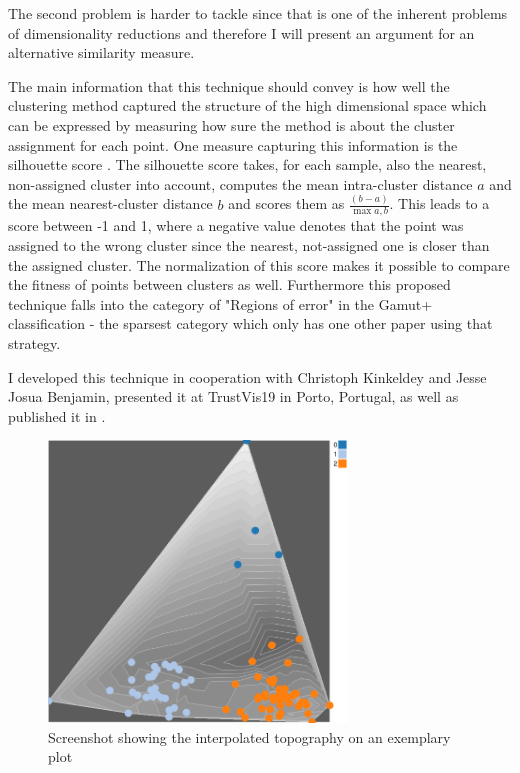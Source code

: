 The second problem is harder to tackle since that is one of the inherent problems of dimensionality reductions and therefore I will present an argument for an alternative similarity measure.

The main information that this technique should convey is how well the clustering method captured the structure of the high dimensional space which can be expressed by measuring how sure the method is about the cluster assignment for each point. One measure capturing this information is the silhouette score \cite{rousseeuwSilhouettesGraphicalAid1987}. The silhouette score takes, for each sample, also the nearest, non-assigned cluster into account, computes the mean intra-cluster distance $a$ and the mean nearest-cluster distance $b$ and scores them as $\frac{(b-a)}{\max{a,b}}$. This leads to a score between -1 and 1, where a negative value denotes that the point was assigned to the wrong cluster since the nearest, not-assigned one is closer than the assigned cluster. The normalization of this score makes it possible to compare the fitness of points between clusters as well. Furthermore this proposed technique falls into the category of "Regions of error" in the Gamut+ classification - the sparsest category which only has one other paper using that strategy. 

I developed this technique in cooperation with Christoph Kinkeldey and Jesse Josua Benjamin, presented it at TrustVis19 in Porto, Portugal, as well as published it in \cite{christophkinkeldeySupportingInterpretabilityClustering2019}.

\begin{figure}[t]
	\centering
	\includegraphics[width=300px]{../chapters/validation/pics/topography}
	\caption{\label{pic:topography} Screenshot showing the interpolated topography on an exemplary plot}
\end{figure}

